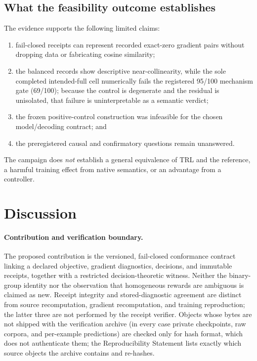 \documentclass{article}
\begin{document}
\subsection{What the feasibility outcome establishes}

The evidence supports the following limited claims:
\begin{enumerate}[leftmargin=*,itemsep=2pt]
  \item fail-closed receipts can represent recorded exact-zero gradient pairs
  without dropping data or fabricating cosine similarity;
  \item the balanced records show descriptive near-collinearity, while the sole
  completed intended-full cell numerically fails the registered 95/100
  mechanism gate (69/100); because the control is degenerate and the residual
  is unisolated, that failure is uninterpretable as a semantic verdict;
  \item the frozen positive-control construction was infeasible for the chosen
  model/decoding contract; and
  \item the preregistered causal and confirmatory questions remain unanswered.
\end{enumerate}

The campaign does \emph{not} establish a general equivalence of TRL and the
reference, a harmful training effect from native semantics, or an advantage from
a controller.

\section{Discussion}

\paragraph{Contribution and verification boundary.}
The proposed contribution is the versioned, fail-closed conformance contract
linking a declared objective, gradient diagnostics, decisions, and immutable
receipts, together with a restricted decision-theoretic witness. Neither the
binary-group identity nor the observation that homogeneous rewards are
ambiguous is claimed as new. Receipt integrity and stored-diagnostic agreement
are distinct from source recomputation, gradient recomputation, and training
reproduction; the latter three are not performed by the receipt verifier.
Objects whose bytes are not shipped with the verification archive (in every
case private checkpoints, raw corpora, and per-example predictions) are checked
only for hash format, which does not authenticate them; the Reproducibility
Statement lists exactly which source objects the archive contains and
re-hashes.
\end{document}
